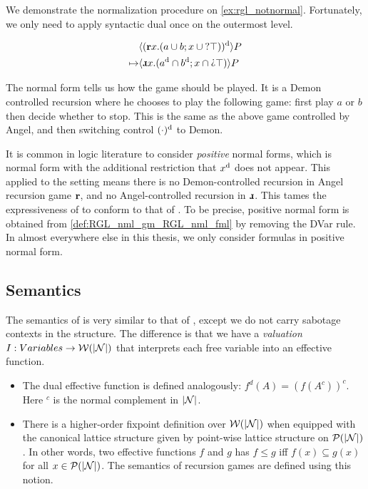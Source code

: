 We demonstrate the normalization procedure on \autoref{ex:rgl_notnormal}. Fortunately, we only need to apply syntactic dual once on the outermost level.

\begin{align*}
     & \langle\Dual{(\Rec x. (a\cup b; x \cup \Test \top) )}\rangle P \\
    \mapsto & \langle\DRec x. (\Dual{a}\cap\Dual{b}; x\cap \DTest\top) \rangle P \\
\end{align*}

The normal form tells us how the game should be played. It is a Demon controlled recursion where he chooses to play the following game: first play $a$ or $b$ then decide whether to stop. This is the same as the above game controlled by Angel, and then switching control $(\cdot)^\text{d}$ to Demon.

It is common in logic literature to consider \textit{positive} normal forms, which is normal form with the additional restriction that $x^\text{d}$ does not appear. This applied to the \RGL{} setting means there is no Demon-controlled recursion in Angel recursion game $\textbf{r}$, and no Angel-controlled recursion in $\DRec$. This tames the expressiveness of \RGL{} to conform to that of \GLs{}. To be precise, positive normal form is obtained from \autoref{def:RGL_nml_gm_RGL_nml_fml} by removing the DVar rule. In almost everywhere else in this thesis, we only consider \RGL{} formulas in positive normal form.

\subsection{Semantics}
\label{subsec:RGL_sem}
The semantics of \RGL{} is very similar to that of \GLs{}, except we do not carry sabotage contexts in the structure. The difference is that we have a \textit{valuation} $I: Variables \rightarrow \mathcal{W}(|\mathcal{N}|)$ that interprets each free variable into an effective function.

\begin{remark}
    \begin{itemize}
        \item The dual effective function is defined analogously: $f^d(A) = (f(A^c))^c$. Here $^c$ is the normal complement in $|\mathcal N|$.
        \item There is a higher-order fixpoint definition over $\mathcal W(|\mathcal N|)$ when equipped with the canonical lattice structure given by point-wise lattice structure on $\mathcal{P}(|\mathcal N|)$. In other words, two effective functions $f$ and $g$ has $f\leq g$ iff $f(x)\subseteq g(x)$ for all $x\in\mathcal{P}(|\mathcal N|)$. The semantics of recursion games are defined using this notion.
    \end{itemize}
\end{remark}

